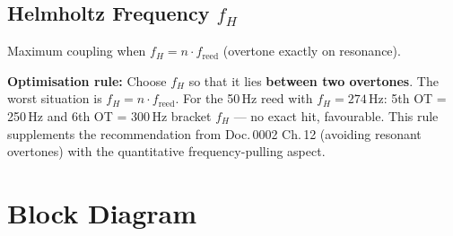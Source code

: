 \documentclass[11pt,a4paper]{article}
\begin{document}
\subsection{Helmholtz Frequency $f_H$}

Maximum coupling when $f_H = n \cdot f_\text{reed}$ (overtone exactly on resonance).

\begin{table}[H]
\centering\small
{}
\caption{Amplification factor $G$ at the nearest overtone. $f_H = 274$\,Hz: $G = 4{.}7$ --- not a direct hit, but close enough for noticeable coupling.}
\end{table}

\begin{keybox}
\textbf{Optimisation rule:} Choose $f_H$ so that it lies \textbf{between two overtones}. The worst situation is $f_H = n \cdot f_\text{reed}$. For the 50\,Hz reed with $f_H = 274$\,Hz: 5th OT = 250\,Hz and 6th OT = 300\,Hz bracket $f_H$ --- no exact hit, favourable. This rule supplements the recommendation from Doc.\,0002 Ch.\,12 (avoiding resonant overtones) with the quantitative frequency-pulling aspect.
\end{keybox}

\section{Block Diagram}
\end{document}
